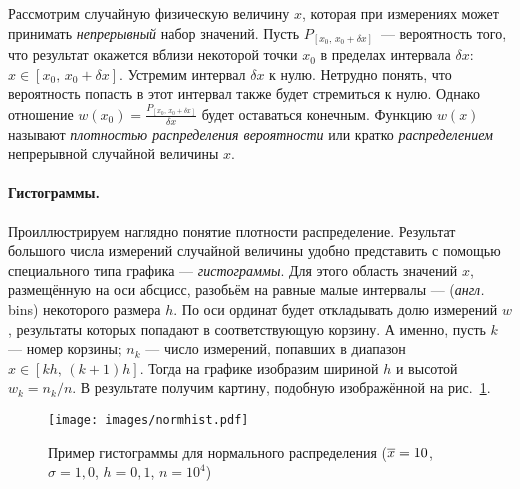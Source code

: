 Рассмотрим случайную физическую величину $x$, которая при измерениях может
принимать \emph{непрерывный} набор значений. Пусть
$P_{[x_0,\,x_0+\delta x]}$~--- вероятность того, что результат окажется вблизи
некоторой точки $x_0$ в пределах интервала $\delta x$: $x\in [x_0,\,x_0+\delta x]$.
Устремим интервал
$\delta x$ к нулю. Нетрудно понять, что вероятность попасть в этот интервал
также будет стремиться к нулю. Однако отношение
$w(x_0) = \frac{P_{[x_0,\,x_0+\delta x]}}{\delta x}$ будет оставаться конечным.
Функцию $w(x)$ называют \emph{плотностью распределения вероятности} или кратко
\emph{распределением} непрерывной случайной величины $x$.



\paragraph{Гистограммы.}
Проиллюстрируем наглядно понятие плотности распределение. Результат
большого числа измерений случайной величины удобно представить с помощью
специального типа графика --- \emph{гистограммы}.
Для этого область значений $x$, размещённую на оси абсцисс, разобьём на
равные малые интервалы ---  (\emph{англ.} bins)
некоторого размера $h$. По оси ординат будет откладывать долю измерений $w$,
результаты которых попадают в соответствующую корзину. А именно,
пусть $k$ --- номер корзины; $n_k$ --- число измерений, попавших
в диапазон $x\in [kh,\,(k+1)h]$. Тогда  на графике изобразим 
шириной $h$ и высотой $w_{k}=n_{k}/n$.
В результате получим картину, подобную изображённой на рис.~\ref{fig:normhist}.

\begin{figure}[h!]
    \centering
    \texttt{[image: images/normhist.pdf]}
    \caption{Пример гистограммы для нормального распределения ($\overline{x}=10$,
$\sigma=1{,}0$, $h=0{,}1$, $n=10^{4}$)}\label{fig:normhist}
\end{figure}

